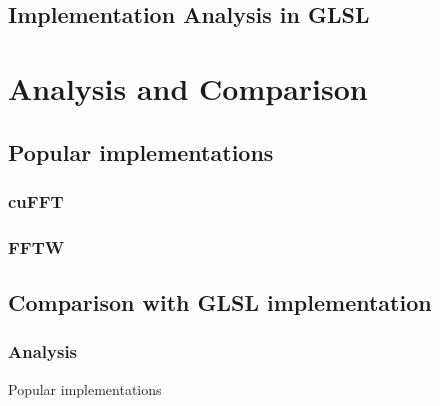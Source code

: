 \documentclass[
  oneside,
  11pt, a4paper,
  footinclude=true,
  headinclude=true,
  cleardoublepage=empty
]{scrbook}
\begin{document}
\section{Implementation Analysis in GLSL}

\chapter{Analysis and Comparison}
\section{Popular implementations}
\subsection{cuFFT}
\subsection{FFTW}
\section{Comparison with GLSL implementation}
\subsection{Analysis}
Popular implementations


\cleardoublepage



\printindex

    
    \appendix
    \renewcommand\chaptername{Appendix}



\end{document}
